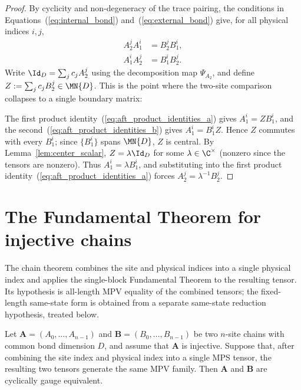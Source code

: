 \begin{proof}
    \leanok
    By cyclicity and non-degeneracy of the trace pairing,
    the conditions in Equations~(\ref{eq:internal_bond}) and~(\ref{eq:external_bond})
    give, for all physical indices $i,j$,
    \begin{align}
        A_2^{j} A_1^{i} & = B_2^{j} B_1^{i}, \label{eq:aft_product_identities_a} \\
        A_1^{i} A_2^{j} & = B_1^{i} B_2^{j}. \label{eq:aft_product_identities_b}
    \end{align}
    Write $\Id_D = \sum_j c_j A_2^j$ using the decomposition map
    $\Psi_{A_2}$, and define $Z := \sum_j c_j B_2^j \in \MN{D}$.
    This is the point where the two-site comparison collapses to a single
    boundary matrix:
    \begin{center}
        \qquad
    \end{center}
    The first product identity~(\ref{eq:aft_product_identities_a}) gives
    $A_1^i = Z B_1^i$, and the second~(\ref{eq:aft_product_identities_b})
    gives $A_1^i = B_1^i Z$.
    Hence $Z$ commutes with every $B_1^i$; since $\{B_1^i\}$ spans
    $\MN{D}$, $Z$ is central.
    By Lemma~\ref{lem:center_scalar}, $Z = \lambda \Id_D$ for some
    $\lambda \in \C^{\times}$ (nonzero since the tensors are nonzero).
    Thus $A_1^i = \lambda B_1^i$, and substituting into the first product
    identity~(\ref{eq:aft_product_identities_a}) forces $A_2^j = \lambda^{-1} B_2^j$.
\end{proof}

\section{The Fundamental Theorem for injective chains}%
\label{sec:ft_chain}

The chain theorem combines the site and physical indices into a single
physical index and applies the single-block Fundamental Theorem to the
resulting tensor. Its hypothesis is all-length MPV equality of the
combined tensors; the fixed-length same-state form is obtained from a
separate same-state reduction hypothesis, treated below.

\begin{theorem}%
    \label{thm:fundamentalTheorem_injective_chain}
    \leanok
    Let $\mathbf{A} = (A_0, \ldots, A_{n-1})$ and
    $\mathbf{B} = (B_0, \ldots, B_{n-1})$ be two $n$-site chains with
    common bond dimension $D$, and assume that $\mathbf{A}$ is injective.
    Suppose that, after combining the site index and physical index into a
    single MPS tensor, the resulting two tensors generate the same MPV
    family. Then $\mathbf{A}$ and $\mathbf{B}$ are cyclically gauge
    equivalent.
\end{theorem}

